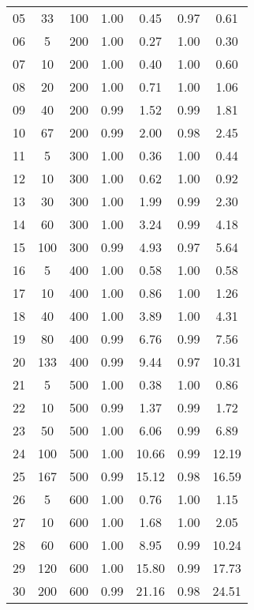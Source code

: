 \documentclass[11pt]{article}
\begin{document}
\begin{table}[]
\begin{tabular}{ccccccc}
			\rowcolor[HTML]{EFEFEF} 
			05 & 33 & 100 & 1.00 & 0.45 & 0.97 & 0.61 \\
			06 & 5 & 200 & 1.00 & 0.27 & 1.00 & 0.30 \\
			07 & 10 & 200 & 1.00 & 0.40 & 1.00 & 0.60 \\
			08 & 20 & 200 & 1.00 & 0.71 & 1.00 & 1.06 \\
			09 & 40 & 200 & 0.99 & 1.52 & 0.99 & 1.81 \\
			10 & 67 & 200 & 0.99 & 2.00 & 0.98 & 2.45 \\
			\rowcolor[HTML]{EFEFEF} 
			11 & 5 & 300 & 1.00 & 0.36 & 1.00 & 0.44 \\
			\rowcolor[HTML]{EFEFEF} 
			12 & 10 & 300 & 1.00 & 0.62 & 1.00 & 0.92 \\
			\rowcolor[HTML]{EFEFEF} 
			13 & 30 & 300 & 1.00 & 1.99 & 0.99 & 2.30 \\
			\rowcolor[HTML]{EFEFEF} 
			14 & 60 & 300 & 1.00 & 3.24 & 0.99 & 4.18 \\
			\rowcolor[HTML]{EFEFEF} 
			15 & 100 & 300 & 0.99 & 4.93 & 0.97 & 5.64 \\
			16 & 5 & 400 & 1.00 & 0.58 & 1.00 & 0.58 \\
			17 & 10 & 400 & 1.00 & 0.86 & 1.00 & 1.26 \\
			18 & 40 & 400 & 1.00 & 3.89 & 1.00 & 4.31 \\
			19 & 80 & 400 & 0.99 & 6.76 & 0.99 & 7.56 \\
			20 & 133 & 400 & 0.99 & 9.44 & 0.97 & 10.31 \\
			\rowcolor[HTML]{EFEFEF} 
			21 & 5 & 500 & 1.00 & 0.38 & 1.00 & 0.86 \\
			\rowcolor[HTML]{EFEFEF} 
			22 & 10 & 500 & 0.99 & 1.37 & 0.99 & 1.72 \\
			\rowcolor[HTML]{EFEFEF} 
			23 & 50 & 500 & 1.00 & 6.06 & 0.99 & 6.89 \\
			\rowcolor[HTML]{EFEFEF} 
			24 & 100 & 500 & 1.00 & 10.66 & 0.99 & 12.19 \\
			\rowcolor[HTML]{EFEFEF} 
			25 & 167 & 500 & 0.99 & 15.12 & 0.98 & 16.59 \\
			26 & 5 & 600 & 1.00 & 0.76 & 1.00 & 1.15 \\
			27 & 10 & 600 & 1.00 & 1.68 & 1.00 & 2.05 \\
			28 & 60 & 600 & 1.00 & 8.95 & 0.99 & 10.24 \\
			29 & 120 & 600 & 1.00 & 15.80 & 0.99 & 17.73 \\
			30 & 200 & 600 & 0.99 & 21.16 & 0.98 & 24.51 \\

\end{tabular}
\end{table}
\end{document}
